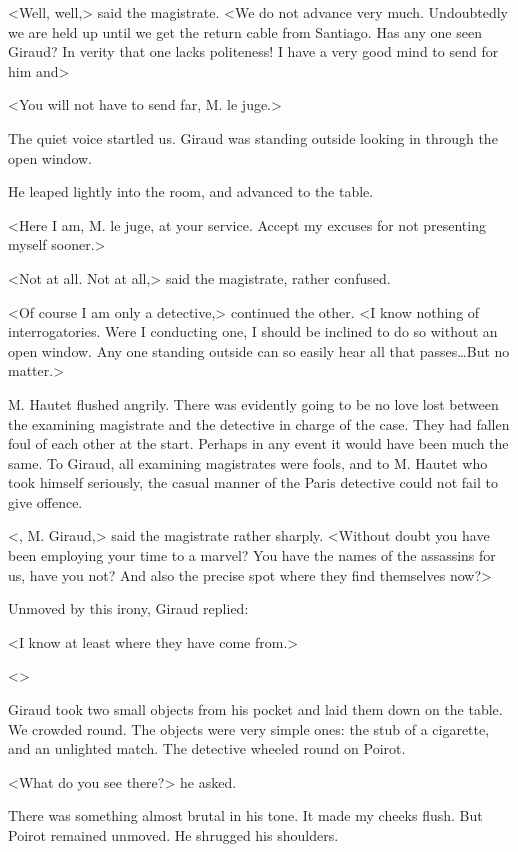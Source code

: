  <Well, well,> said the magistrate. <We do not advance very much. Undoubtedly we are held up until we get the return cable from Santiago. Has any one seen Giraud? In verity that one lacks politeness! I have a very good mind to send for him and\longdash> 

 <You will not have to send far, M. le juge.> 

 The quiet voice startled us. Giraud was standing outside looking in through the open window. 

 He leaped lightly into the room, and advanced to the table. 

 <Here I am, M. le juge, at your service. Accept my excuses for not presenting myself sooner.> 

 <Not at all. Not at all,> said the magistrate, rather confused. 

 <Of course I am only a detective,> continued the other. <I know nothing of interrogatories. Were I conducting one, I should be inclined to do so without an open window. Any one standing outside can so easily hear all that passes\dots But no matter.> 

 M. Hautet flushed angrily. There was evidently going to be no love lost between the examining magistrate and the detective in charge of the case. They had fallen foul of each other at the start. Perhaps in any event it would have been much the same. To Giraud, all examining magistrates were fools, and to M. Hautet who took himself seriously, the casual manner of the Paris detective could not fail to give offence. 

 <, M. Giraud,> said the magistrate rather sharply. <Without doubt you have been employing your time to a marvel? You have the names of the assassins for us, have you not? And also the precise spot where they find themselves now?> 

 Unmoved by this irony, Giraud replied: 

 <I know at least where they have come from.> 

 <> 

 Giraud took two small objects from his pocket and laid them down on the table. We crowded round. The objects were very simple ones: the stub of a cigarette, and an unlighted match. The detective wheeled round on Poirot. 

 <What do you see there?> he asked. 

 There was something almost brutal in his tone. It made my cheeks flush. But Poirot remained unmoved. He shrugged his shoulders. 


